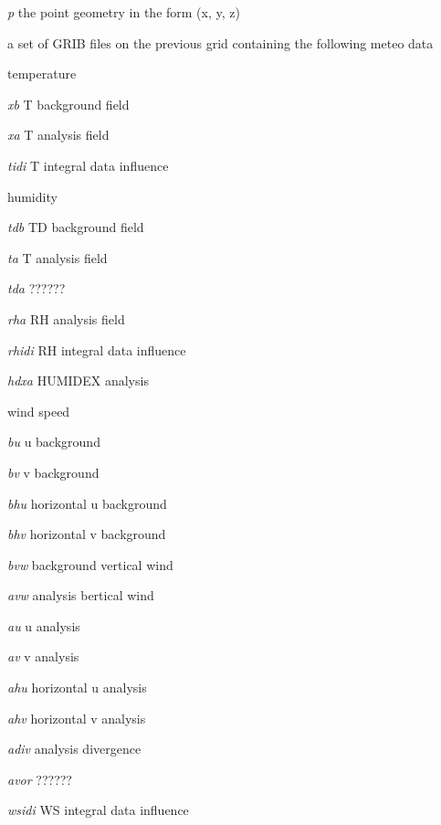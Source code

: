 \begin{DoxyItemize}
\begin{DoxyEnumerate}
\item {\itshape p} the point geometry in the form (x, y, z) 
\end{DoxyEnumerate}
\item a set of G\-R\-I\-B files on the previous grid containing the following meteo data 
\begin{DoxyItemize}
\item temperature 
\begin{DoxyEnumerate}
\item {\itshape xb} T background field 
\item {\itshape xa} T analysis field 
\item {\itshape tidi} T integral data influence 
\end{DoxyEnumerate}
\item humidity 
\begin{DoxyEnumerate}
\item {\itshape tdb} T\-D background field 
\item {\itshape ta} T analysis field 
\item {\itshape tda} ?????? 
\item {\itshape rha} R\-H analysis field 
\item {\itshape rhidi} R\-H integral data influence 
\item {\itshape hdxa} H\-U\-M\-I\-D\-E\-X analysis 
\end{DoxyEnumerate}
\item wind speed 
\begin{DoxyEnumerate}
\item {\itshape bu} u background 
\item {\itshape bv} v background 
\item {\itshape bhu} horizontal u background 
\item {\itshape bhv} horizontal v background 
\item {\itshape bvw} background vertical wind 
\item {\itshape avw} analysis bertical wind 
\item {\itshape au} u analysis 
\item {\itshape av} v analysis 
\item {\itshape ahu} horizontal u analysis 
\item {\itshape ahv} horizontal v analysis 
\item {\itshape adiv} analysis divergence 
\item {\itshape avor} ?????? 
\item {\itshape wsidi} W\-S integral data influence 

\end{DoxyEnumerate}
\end{DoxyItemize}
\end{DoxyItemize}
